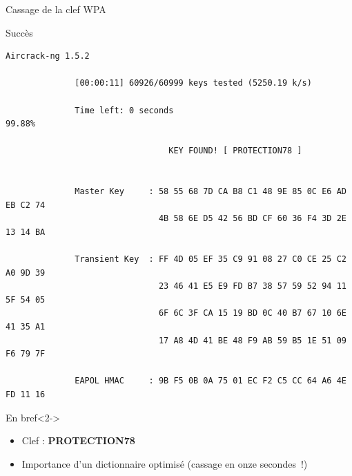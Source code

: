 \documentclass[10pt,sans,usenames,dvipsnames,french,compress]{beamer}
\begin{document}
\begin{frame}[fragile]{Cassage de la clef WPA}
	\vspace{-1mm}
	\begin{block}{Succès}
		\vspace{-3mm}
		\begin{lstlisting}[style=Term]
		                              Aircrack-ng 1.5.2

		      [00:00:11] 60926/60999 keys tested (5250.19 k/s)

		      Time left: 0 seconds                                      99.88%

		                         KEY FOUND! [ PROTECTION78 ]


		      Master Key     : 58 55 68 7D CA B8 C1 48 9E 85 0C E6 AD EB C2 74
		                       4B 58 6E D5 42 56 BD CF 60 36 F4 3D 2E 13 14 BA

		      Transient Key  : FF 4D 05 EF 35 C9 91 08 27 C0 CE 25 C2 A0 9D 39
		                       23 46 41 E5 E9 FD B7 38 57 59 52 94 11 5F 54 05
		                       6F 6C 3F CA 15 19 BD 0C 40 B7 67 10 6E 41 35 A1
		                       17 A8 4D 41 BE 48 F9 AB 59 B5 1E 51 09 F6 79 7F

		      EAPOL HMAC     : 9B F5 0B 0A 75 01 EC F2 C5 CC 64 A6 4E FD 11 16
		\end{lstlisting}
		\vspace{-2mm}

	\end{block}
	\vspace{-1mm}
	\begin{exampleblock}{En bref}<2->
		\begin{itemize}
			\item Clef : \textbf{PROTECTION78}
			\item<3-> Importance d'un dictionnaire optimisé (cassage en onze secondes !)
		\end{itemize}
	\end{exampleblock}
\end{frame}
\end{document}
